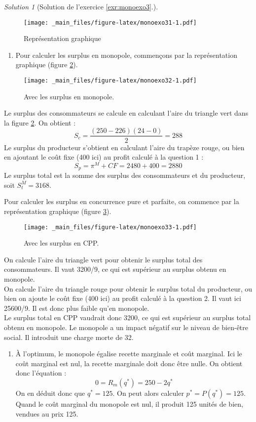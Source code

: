 \documentclass[
]{book}
\providecommand{\tightlist}{%
  \setlength{\itemsep}{0pt}\setlength{\parskip}{0pt}}
\theoremstyle{definition}
\theoremstyle{definition}
\theoremstyle{definition}
\theoremstyle{definition}
\theoremstyle{remark}
\newtheorem*{solution}{Solution}
\begin{document}
\begin{solution}[Solution de l'exercice  \ref{exr:monoexo3}.]
\begin{figure}
\centering
\texttt{[image: \_main\_files/figure-latex/monoexo31-1.pdf]}
\caption{\label{fig:monoexo31}Représentation graphique}
\end{figure}

\begin{enumerate}
\def\labelenumi{\arabic{enumi}.}
\setcounter{enumi}{2}
\tightlist
\item
  Pour calculer les surplus en monopole, commençons par la représentation graphique (figure \ref{fig:monoexo32}).
\end{enumerate}

\begin{figure}
\centering
\texttt{[image: \_main\_files/figure-latex/monoexo32-1.pdf]}
\caption{\label{fig:monoexo32}Avec les surplus en monopole.}
\end{figure}

Le surplus des consommateurs se calcule en calculant l'aire du triangle vert dans la figure \ref{fig:monoexo32}.
On obtient :
\[S_c=\frac{(250-226)(24-0)}{2}=288\]
Le surplus du producteur s'obtient en calculant l'aire du trapèze rouge, ou bien en ajoutant le coût fixe (400 ici) au profit calculé à la question 1 :
\[S_p=\pi^M+CF=2480+400=2880\]
Le surplus total est la somme des surplus des consommateurs et du producteur, soit \(S_t^M=3168\).

Pour calculer les surplus en concurrence pure et parfaite, on commence par la représentation graphique (figure \ref{fig:monoexo33}).

\begin{figure}
\centering
\texttt{[image: \_main\_files/figure-latex/monoexo33-1.pdf]}
\caption{\label{fig:monoexo33}Avec les surplus en CPP.}
\end{figure}

On calcule l'aire du triangle vert pour obtenir le surplus total des consommateurs.
Il vaut 3200/9, ce qui est supérieur au surplus obtenu en monopole.\\
On calcule l'aire du triangle rouge pour obtenir le surplus total du producteur, ou bien on ajoute le coût fixe (400 ici) au profit calculé à la question 2.
Il vaut ici 25600/9.
Il est donc plus faible qu'en monopole.\\
Le surplus total en CPP vaudrait donc 3200, ce qui est supérieur au surplus total obtenu en monopole.
Le monopole a un impact négatif sur le niveau de bien-être social.
Il introduit une charge morte de 32.

\begin{enumerate}
\def\labelenumi{\arabic{enumi}.}
\setcounter{enumi}{3}
\tightlist
\item
  À l'optimum, le monopole égalise recette marginale et coût marginal.
  Ici le coût marginal est nul, la recette marginale doit donc être nulle.
  On obtient donc l'équation :
  \[
  0=R_m(q^*)=250-2q^*
  \]
  On en déduit donc que \(q^*=125\).
  On peut alors calculer \(p^*=P(q^*)=125\).
  Quand le coût marginal du monopole est nul, il produit 125 unités de bien, vendues au prix 125.
\end{enumerate}

\end{solution}
\end{document}
